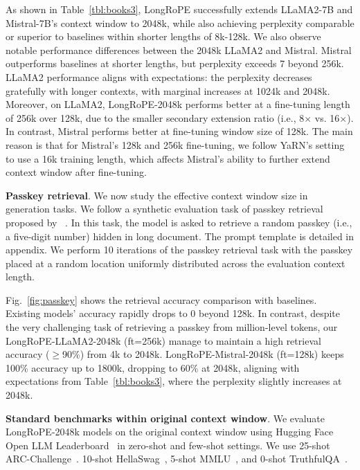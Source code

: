 As shown in Table~\ref{tbl:books3}, LongRoPE successfully extends LLaMA2-7B and Mistral-7B's context window to 2048k, while also achieving perplexity comparable or superior to baselines within shorter lengths of 8k-128k. We also observe notable performance differences between the 2048k LLaMA2 and Mistral.  Mistral outperforms baselines at shorter lengths, but perplexity exceeds 7 beyond 256k. LLaMA2 performance aligns with expectations: the perplexity decreases gratefully with longer contexts, with marginal increases at 1024k and 2048k. Moreover, on LLaMA2, LongRoPE-2048k performs better at a fine-tuning length of 256k over 128k, due to the smaller secondary extension ratio (i.e., 8$\times$ vs. 16$\times$). In contrast, Mistral performs better at fine-tuning window size of 128k.  The main reason is that for Mistral's 128k and 256k fine-tuning, we follow YaRN's setting to use a 16k training length, which affects Mistral's ability to further extend context window after fine-tuning.  

\textbf{Passkey retrieval}. We now study the effective context window size in generation tasks. We follow a synthetic evaluation task of passkey retrieval proposed by ~\cite{passkey}. In this task, the model is asked to retrieve a random passkey (i.e., a five-digit number) hidden in long document. The prompt template is detailed in appendix. We perform 10 iterations of the passkey retrieval task with the passkey placed at a random location uniformly distributed across the evaluation context length.

 Fig.~\ref{fig:passkey} shows the retrieval accuracy comparison  with baselines. Existing models' accuracy rapidly drops to 0 beyond 128k.  In contrast, despite the very challenging task of retrieving a passkey from million-level tokens, our LongRoPE-LLaMA2-2048k (ft=256k)  manage to maintain a high retrieval accuracy ($\ge$90\%) from 4k to 2048k. LongRoPE-Mistral-2048k (ft=128k) keeps 100\% accuracy up to 1800k, dropping to 60\% at 2048k, aligning with expectations from Table~\ref{tbl:books3}, where the perplexity slightly increases at 2048k.

\textbf{Standard benchmarks within original context window}. We evaluate LongRoPE-2048k models on the original context window using Hugging Face Open LLM Leaderboard~\cite{huggingfaceboard} in zero-shot and few-shot settings. We use 25-shot ARC-Challenge~\cite{allenai:arc}. 10-shot HellaSwag~\cite{zellers2019hellaswag}, 5-shot MMLU~\cite{mmlu}, and 0-shot TruthfulQA~\cite{lin2021truthfulqa}. 

